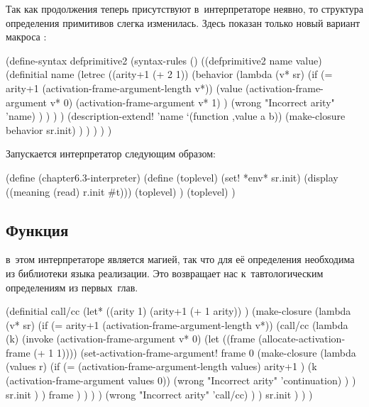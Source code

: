 Так как продолжения теперь присутствуют в~интерпретаторе неявно, то структура
определения примитивов слегка изменилась. Здесь показан только новый вариант
макроса :

\begin{code:lisp}
(define-syntax defprimitive2
  (syntax-rules ()
    ((defprimitive2 name value)
     (definitial name
       (letrec ((arity+1 (+ 2 1))
                (behavior
                 (lambda (v* sr)
                   (if (= arity+1 (activation-frame-argument-length v*))
                       (value (activation-frame-argument v* 0)
                              (activation-frame-argument v* 1) )
                       (wrong "Incorrect arity" 'name) ) ) ) )
         (description-extend! 'name `(function ,value a b))
         (make-closure behavior sr.init) ) ) ) ) )
\end{code:lisp}

Запускается интерпретатор следующим образом:

\begin{code:lisp}
(define (chapter6.3-interpreter)
  (define (toplevel)
    (set! *env* sr.init)
    (display ((meaning (read) r.init #t)))
    (toplevel) )
  (toplevel) )
\end{code:lisp}


\subsection{\texorpdfstring{Функция \protect{}}{Функция call/cc}}%
\label{fast/dilute/ssect:call/cc}

 в~этом интерпретаторе является магией, так что для её определения
необходима  из библиотеки языка реализации. Это возвращает нас
к~тавтологическим определениям из первых~глав.

\begin{code:lisp}
(definitial call/cc
  (let* ((arity 1)
         (arity+1 (+ 1 arity)) )
    (make-closure
      (lambda (v* sr)
        (if (= arity+1 (activation-frame-argument-length v*))
            (call/cc
             (lambda (k)
               (invoke
                (activation-frame-argument v* 0)
                (let ((frame (allocate-activation-frame (+ 1 1))))
                  (set-activation-frame-argument!
                   frame 0
                   (make-closure
                    (lambda (values r)
                      (if (= (activation-frame-argument-length values)
                             arity+1 )
                          (k (activation-frame-argument values 0))
                          (wrong "Incorrect arity" 'continuation) ) )
                    sr.init ) )
                  frame ) ) ) )
            (wrong "Incorrect arity" 'call/cc) ) )
      sr.init ) ) )
\end{code:lisp}

